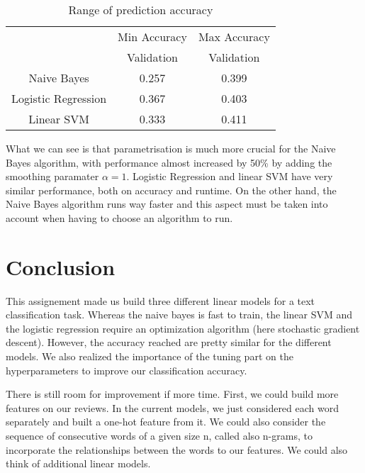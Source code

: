\documentclass[11pt]{article}
\begin{document}
\begin{table}[h!]
\centering
\caption{Range of prediction accuracy}
\label{my-label}
\begin{tabular}{c|c|c|}
\cline{2-3}
\multicolumn{1}{l|}{}                     & Min Accuracy & Max Accuracy \\ \cline{2-3} 
\multicolumn{1}{l|}{}                     & Validation   & Validation   \\ \hline
\multicolumn{1}{|c|}{Naive Bayes}         & 0.257        & 0.399        \\ \hline
\multicolumn{1}{|c|}{Logistic Regression} & 0.367        & 0.403        \\ \hline
\multicolumn{1}{|c|}{Linear SVM}          & 0.333        & 0.411        \\ \hline
\end{tabular}
\end{table}

What we can see is that parametrisation is much more crucial for the Naive Bayes algorithm, with performance almost increased by 50\% by adding the smoothing paramater $\alpha = 1$. Logistic Regression and linear SVM have very similar performance, both on accuracy and runtime. On the other hand, the Naive Bayes algorithm runs way faster and this aspect must be taken into account when having to choose an algorithm to run.
 

\section{Conclusion}


This assignement made us build three different linear models for a text classification task. Whereas the naive bayes is fast to train, the linear SVM and the logistic regression require an optimization algorithm (here stochastic gradient descent). However, the accuracy reached are pretty similar for the different models. We also realized the importance of the tuning part on the hyperparameters to improve our classification accuracy.

There is still room for improvement if more time. First, we could build more features on our reviews. In the current models, we just considered each word separately and built a one-hot feature from it. We could also consider the sequence of consecutive words of a given size n, called also n-grams, to incorporate the relationships between the words to our features. We could also think of additional linear models.



\end{document}
